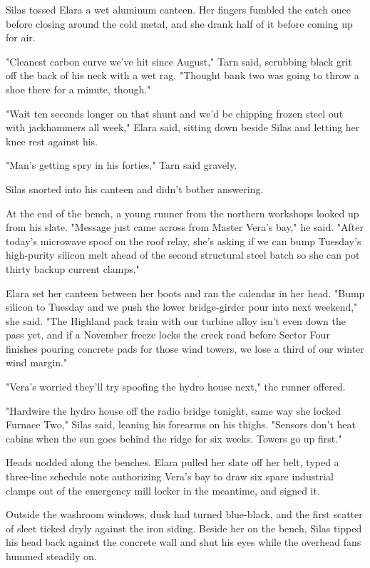 Silas tossed Elara a wet aluminum canteen. Her fingers fumbled the catch once before closing around the cold metal, and she drank half of it before coming up for air.

"Cleanest carbon curve we've hit since August," Tarn said, scrubbing black grit off the back of his neck with a wet rag. "Thought bank two was going to throw a shoe there for a minute, though."

"Wait ten seconds longer on that shunt and we'd be chipping frozen steel out with jackhammers all week," Elara said, sitting down beside Silas and letting her knee rest against his.

"Man's getting spry in his forties," Tarn said gravely.

Silas snorted into his canteen and didn't bother answering.

At the end of the bench, a young runner from the northern workshops looked up from his slate. "Message just came across from Master Vera's bay," he said. "After today's microwave spoof on the roof relay, she's asking if we can bump Tuesday's high-purity silicon melt ahead of the second structural steel batch so she can pot thirty backup current clamps."

Elara set her canteen between her boots and ran the calendar in her head. "Bump silicon to Tuesday and we push the lower bridge-girder pour into next weekend," she said. "The Highland pack train with our turbine alloy isn't even down the pass yet, and if a November freeze locks the creek road before Sector Four finishes pouring concrete pads for those wind towers, we lose a third of our winter wind margin."

"Vera's worried they'll try spoofing the hydro house next," the runner offered.

"Hardwire the hydro house off the radio bridge tonight, same way she locked Furnace Two," Silas said, leaning his forearms on his thighs. "Sensors don't heat cabins when the sun goes behind the ridge for six weeks. Towers go up first."

Heads nodded along the benches. Elara pulled her slate off her belt, typed a three-line schedule note authorizing Vera's bay to draw six spare industrial clamps out of the emergency mill locker in the meantime, and signed it.

Outside the washroom windows, dusk had turned blue-black, and the first scatter of sleet ticked dryly against the iron siding. Beside her on the bench, Silas tipped his head back against the concrete wall and shut his eyes while the overhead fans hummed steadily on.

